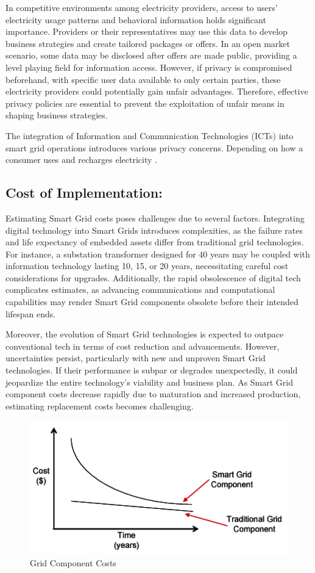In competitive environments among electricity providers, access to users' electricity usage patterns and behavioral information holds significant importance. Providers or their representatives may use this data to develop business strategies and create tailored packages or offers. In an open market scenario, some data may be disclosed after offers are made public, providing a level playing field for information access. However, if privacy is compromised beforehand, with specific user data available to only certain parties, these electricity providers could potentially gain unfair advantages. Therefore, effective privacy policies are essential to prevent the exploitation of unfair means in shaping business strategies.

The integration of Information and Communication Technologies (ICTs) into smart grid operations introduces various privacy concerns. Depending on how a consumer uses and recharges electricity \cite{zeadally2013towards}.

\subsection{Cost of Implementation:}

Estimating Smart Grid costs poses challenges due to several factors. Integrating digital technology into Smart Grids introduces complexities, as the failure rates and life expectancy of embedded assets differ from traditional grid technologies. For instance, a substation transformer designed for 40 years may be coupled with information technology lasting 10, 15, or 20 years, necessitating careful cost considerations for upgrades. Additionally, the rapid obsolescence of digital tech complicates estimates, as advancing communications and computational capabilities may render Smart Grid components obsolete before their intended lifespan ends. 

Moreover, the evolution of Smart Grid technologies is expected to outpace conventional tech in terms of cost reduction and advancements. However, uncertainties persist, particularly with new and unproven Smart Grid technologies. If their performance is subpar or degrades unexpectedly, it could jeopardize the entire technology's viability and business plan. As Smart Grid component costs decrease rapidly due to maturation and increased production, estimating replacement costs becomes challenging\cite{smartgrid}.
\begin{figure}[h]
	\centering
	\includegraphics[width=12cm]{figures/cost.PNG}
	\caption{Grid Component Costs \cite{smartgrid}}
	\label{fig:costs}
\end{figure}
